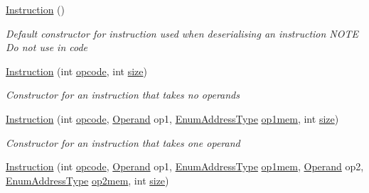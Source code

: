 \begin{DoxyCompactItemize}
\item 
\hyperlink{class_c_p_u___o_s___simulator_1_1_c_p_u_1_1_instruction_a2038c543e7b47a5997405f56cb8c7aa9}{Instruction} ()
\begin{DoxyCompactList}\small\item\em Default constructor for instruction used when deserialising an instruction N\+O\+T\+E Do not use in code \end{DoxyCompactList}\item 
\hyperlink{class_c_p_u___o_s___simulator_1_1_c_p_u_1_1_instruction_ac1fdbf424188acb7f10a1fa93e12a559}{Instruction} (int \hyperlink{class_c_p_u___o_s___simulator_1_1_c_p_u_1_1_instruction_aa8fa753bf6e1b6ffff7060ec90f930af}{opcode}, int \hyperlink{class_c_p_u___o_s___simulator_1_1_c_p_u_1_1_instruction_a8c533b0c08d8ac0a85b0e342f95cfeec}{size})
\begin{DoxyCompactList}\small\item\em Constructor for an instruction that takes no operands \end{DoxyCompactList}\item 
\hyperlink{class_c_p_u___o_s___simulator_1_1_c_p_u_1_1_instruction_a4803bb5f1a9e74ca1d53a3dc11747cd4}{Instruction} (int \hyperlink{class_c_p_u___o_s___simulator_1_1_c_p_u_1_1_instruction_aa8fa753bf6e1b6ffff7060ec90f930af}{opcode}, \hyperlink{class_c_p_u___o_s___simulator_1_1_c_p_u_1_1_operand}{Operand} op1, \hyperlink{namespace_c_p_u___o_s___simulator_1_1_c_p_u_ab76721f84dabbc14c907e6f11fbeb7c0}{Enum\+Address\+Type} \hyperlink{class_c_p_u___o_s___simulator_1_1_c_p_u_1_1_instruction_afd5431d96e8fb78594891c636f2191ca}{op1mem}, int \hyperlink{class_c_p_u___o_s___simulator_1_1_c_p_u_1_1_instruction_a8c533b0c08d8ac0a85b0e342f95cfeec}{size})
\begin{DoxyCompactList}\small\item\em Constructor for an instruction that takes one operand \end{DoxyCompactList}\item 
\hyperlink{class_c_p_u___o_s___simulator_1_1_c_p_u_1_1_instruction_a8cf9df1ad8d64bc27f17eeb5863d9058}{Instruction} (int \hyperlink{class_c_p_u___o_s___simulator_1_1_c_p_u_1_1_instruction_aa8fa753bf6e1b6ffff7060ec90f930af}{opcode}, \hyperlink{class_c_p_u___o_s___simulator_1_1_c_p_u_1_1_operand}{Operand} op1, \hyperlink{namespace_c_p_u___o_s___simulator_1_1_c_p_u_ab76721f84dabbc14c907e6f11fbeb7c0}{Enum\+Address\+Type} \hyperlink{class_c_p_u___o_s___simulator_1_1_c_p_u_1_1_instruction_afd5431d96e8fb78594891c636f2191ca}{op1mem}, \hyperlink{class_c_p_u___o_s___simulator_1_1_c_p_u_1_1_operand}{Operand} op2, \hyperlink{namespace_c_p_u___o_s___simulator_1_1_c_p_u_ab76721f84dabbc14c907e6f11fbeb7c0}{Enum\+Address\+Type} \hyperlink{class_c_p_u___o_s___simulator_1_1_c_p_u_1_1_instruction_aff693a62e411c80f794d0443addfd04b}{op2mem}, int \hyperlink{class_c_p_u___o_s___simulator_1_1_c_p_u_1_1_instruction_a8c533b0c08d8ac0a85b0e342f95cfeec}{size})

\end{DoxyCompactItemize}
